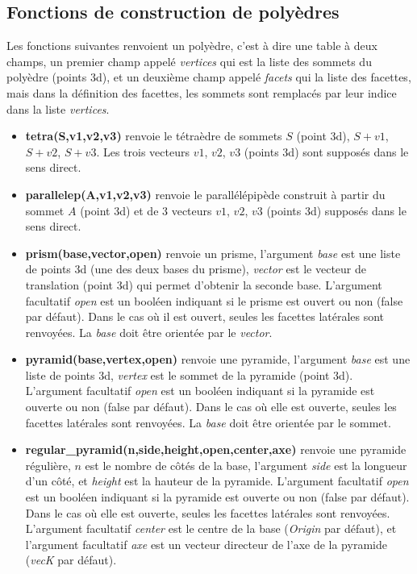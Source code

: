 \subsection{Fonctions de construction de polyèdres}

Les fonctions suivantes renvoient un polyèdre, c'est à dire une table à deux champs, un premier champ appelé \emph{vertices} qui est la liste des sommets du polyèdre (points 3d), et un deuxième champ appelé \emph{facets} qui la liste des facettes, mais dans la définition des facettes, les sommets sont remplacés par leur indice dans la liste \emph{vertices}.

\begin{itemize}
    \item \textbf{tetra(S,v1,v2,v3)} renvoie le tétraèdre de sommets $S$ (point 3d), $S+v1$, $S+v2$, $S+v3$. Les trois vecteurs $v1$, $v2$, $v3$ (points 3d) sont supposés dans le sens direct.
    
    \item \textbf{parallelep(A,v1,v2,v3)} renvoie le parallélépipède construit à partir du sommet $A$ (point 3d) et de 3 vecteurs $v1$, $v2$, $v3$ (points 3d) supposés dans le sens direct.
    
    \item \textbf{prism(base,vector,open)} renvoie un prisme, l'argument \emph{base} est une liste de points 3d (une des deux bases du prisme), \emph{vector} est le vecteur de translation (point 3d) qui permet d'obtenir la seconde base. L'argument facultatif \emph{open} est un booléen indiquant si le prisme est ouvert ou non (false par défaut). Dans le cas où il est ouvert, seules les facettes latérales sont renvoyées. La \emph{base} doit être orientée par le \emph{vector}.
    
    \item \textbf{pyramid(base,vertex,open)} renvoie une pyramide, l'argument \emph{base} est une liste de points 3d, \emph{vertex} est le sommet de la pyramide (point 3d). L'argument facultatif \emph{open} est un booléen indiquant si la pyramide est ouverte ou non (false par défaut). Dans le cas où elle est ouverte, seules les facettes latérales sont renvoyées. La \emph{base} doit être orientée par le sommet.
    
    \item \textbf{regular\_pyramid(n,side,height,open,center,axe)} renvoie une pyramide régulière, $n$ est le nombre de côtés de la base, l'argument \emph{side} est la longueur d'un côté, et \emph{height} est la hauteur de la pyramide. L'argument facultatif \emph{open} est un booléen indiquant si la pyramide est ouverte ou non (false par défaut). Dans le cas où elle est ouverte, seules les facettes latérales sont renvoyées. L'argument facultatif \emph{center} est le centre de la base (\emph{Origin} par défaut), et l'argument facultatif \emph{axe} est un vecteur directeur de l'axe de la pyramide (\emph{vecK} par défaut).
    

\end{itemize}
